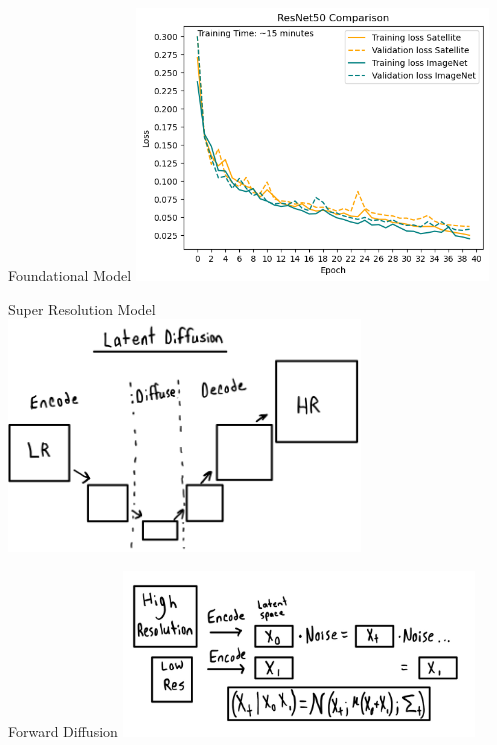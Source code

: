 
\begin{frame}{Foundational Model}
    \centering
    \includegraphics[height=0.7\textheight,width=0.7\textwidth,keepaspectratio]{images/mm_resnet_compare.png}
\end{frame}

\begin{frame}{Super Resolution Model}
    \centering
    \includegraphics[height=0.7\textheight,width=0.7\textwidth,keepaspectratio]{images/mm_Latent_diffuse.png}
\end{frame}

\begin{frame}{Forward Diffusion}
    \centering
    \includegraphics[height=0.7\textheight,width=0.7\textwidth,keepaspectratio]{images/mm_forward.jpeg}
\end{frame}

